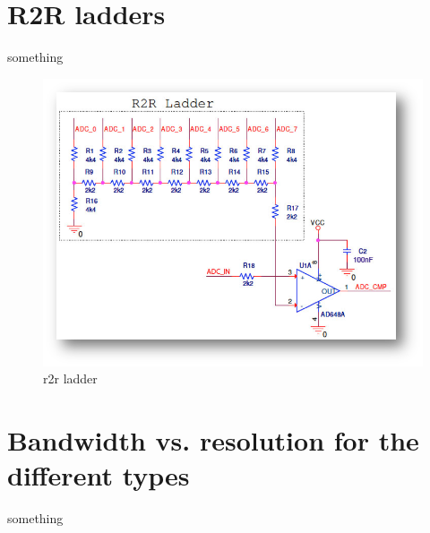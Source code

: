 \section{R2R ladders}
something
\begin{figure}[h!]		%
	\begin{centering}
 		\includegraphics[width=1.0\textwidth]{images/r2r.png}
		\caption{r2r ladder}
	\end{centering}
\end{figure}

\section{Bandwidth vs. resolution for the different types}
something


